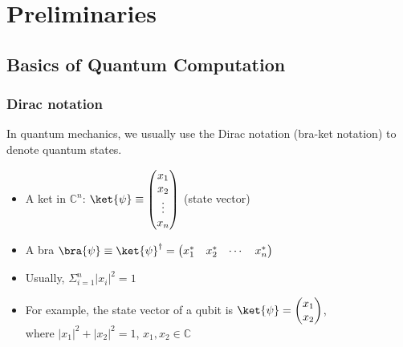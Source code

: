 \documentclass{beamer}
\begin{document}


\section{Preliminaries}

\subsection{Basics of Quantum Computation}

\begin{frame}
    \frametitle{Dirac notation}
    In quantum mechanics, we usually use the Dirac notation (bra-ket notation)
    to denote quantum states.
    \begin{itemize}
        \item A ket in $\mathbb{C}^{n}$:
              $\ket{\psi} \equiv \begin{pmatrix}
                      x_{1} \\ x_{2} \\ \vdots \\ x_{n}
                  \end{pmatrix}$ (state vector)
        \item A bra $\bra{\psi} \equiv \ket{\psi}^{\dagger} = \begin{pmatrix}
                      x_{1}^{*} & x_{2}^{*} & \cdots & x_{n}^{*}
                  \end{pmatrix}$
        \item Usually, $\Sigma_{i=1}^{n} |x_{i}|^{2} = 1$
        \item For example, the state vector of a qubit is $\ket{\psi} = \begin{pmatrix}
                      x_{1} \\ x_{2}
                  \end{pmatrix}$, \\
              where $|x_{1}|^{2} + |x_{2}|^{2} = 1$, $x_{1}, x_{2} \in \mathbb{C}$
    \end{itemize}
\end{frame}
\end{document}

